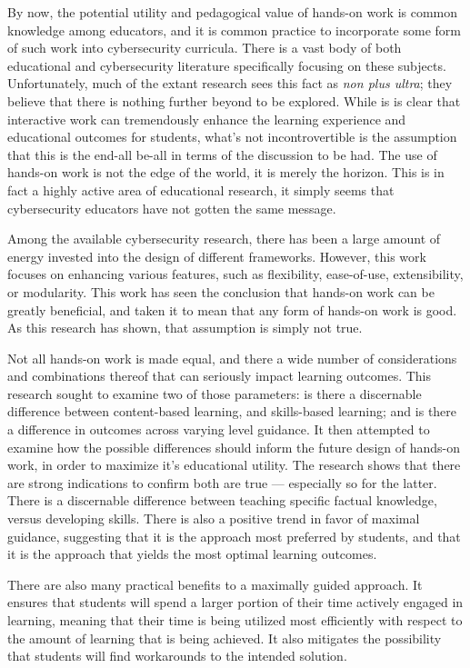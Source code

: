 
By now, the potential utility and pedagogical value of hands-on work is common knowledge among educators, and it is common practice to incorporate some form of such work into cybersecurity curricula. %
There is a vast body of both educational and cybersecurity literature specifically focusing on these subjects. %
Unfortunately, much of the extant research sees this fact as \emph{non plus ultra}; %
they believe that there is nothing further beyond to be explored. %
While is is clear that interactive work can tremendously enhance the learning experience and educational outcomes for students, what's not incontrovertible is the assumption that this is the end-all be-all in terms of the discussion to be had. %
The use of hands-on work is not the edge of the world, it is merely the horizon. %
This is in fact a highly active area of educational research, it simply seems that cybersecurity educators have not gotten the same message. 

Among the available cybersecurity research, there has been a large amount of energy invested into the design of different frameworks. %
However, this work focuses on enhancing various features, such as flexibility, ease-of-use, extensibility, or modularity. %
This work has seen the conclusion that hands-on work can be greatly beneficial, and taken it to mean that any form of hands-on work is good. %
As this research has shown, that assumption is simply not true. 

Not all hands-on work is made equal, and there a wide number of considerations and combinations thereof that can seriously impact learning outcomes. %
This research sought to examine two of those parameters: is there a discernable difference between content-based learning, and skills-based learning; %
and is there a difference in outcomes across varying level guidance. %
It then attempted to examine how the possible differences should inform the future design of hands-on work, in order to maximize it's educational utility. %
The research shows that there are strong indications to confirm both are true ---%
 especially so for the latter. %
There is a discernable difference between teaching specific factual knowledge, versus developing skills. %
There is also a positive trend in favor of maximal guidance, suggesting that it is the approach most preferred by students, and that it is the approach that yields the most optimal learning outcomes. 

There are also many practical benefits to a maximally guided approach. %
It ensures that students will spend a larger portion of their time actively engaged in learning, meaning that their time is being utilized most efficiently with respect to the amount of learning that is being achieved. %
It also mitigates the possibility that students will find workarounds to the intended solution. 


